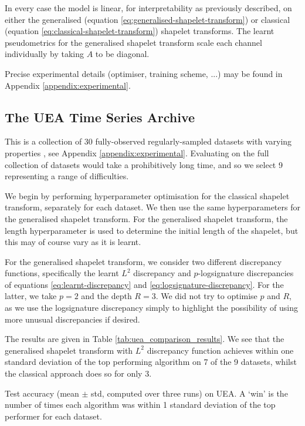 \documentclass{article}
\theoremstyle{plain}
\theoremstyle{definition}
\begin{document}
In every case the model is linear, for interpretability as previously described, on either the generalised (equation \eqref{eq:generalised-shapelet-transform}) or classical (equation \eqref{eq:classical-shapelet-transform}) shapelet transforms. The learnt pseudometrics for the generalised shapelet transform scale each channel individually by taking $A$ to be diagonal.

Precise experimental details (optimiser, training scheme, ...) may be found in Appendix \ref{appendix:experimental}.

\subsection{The UEA Time Series Archive} \label{subsec:uea_classification}
This is a collection of 30 fully-observed regularly-sampled datasets with varying properties \cite{bagnall2018uea}, see Appendix \ref{appendix:experimental}. Evaluating on the full collection of datasets would take a prohibitively long time, and so we select 9 representing a range of difficulties.

We begin by performing hyperparameter optimisation %
for the classical shapelet transform, separately for each dataset. We then use the same hyperparameters for the generalised shapelet transform. For the generalised shapelet transform, the length hyperparameter is used to determine the initial length of the shapelet, but this may of course vary as it is learnt.

For the generalised shapelet transform, we consider two different discrepancy functions, specifically the learnt $L^2$ discrepancy and $p$-logsignature discrepancies of equations \eqref{eq:learnt-discrepancy} and \eqref{eq:logsignature-discrepancy}. For the latter, we take $p=2$ and the depth $R=3$. We did not try to optimise $p$ and $R$, as we use the logsignature discrepancy simply to highlight the possibility of using more unusual discrepancies if desired.

The results are given in Table \ref{tab:uea_comparison_results}. We see that the generalised shapelet transform with $L^2$ discrepancy function achieves within one standard deviation of the top performing algorithm on 7 of the 9 datasets, whilst the classical approach does so for only 3.%
\begin{table}[t]
    \centering
    \caption{Test accuracy (mean $\pm$ std, computed over three runs) on UEA. A `win' is the number of times each algorithm was within 1 standard deviation of the top performer for each dataset.}
    \label{tab:uea_comparison_results}
    
\end{table}
\end{document}
